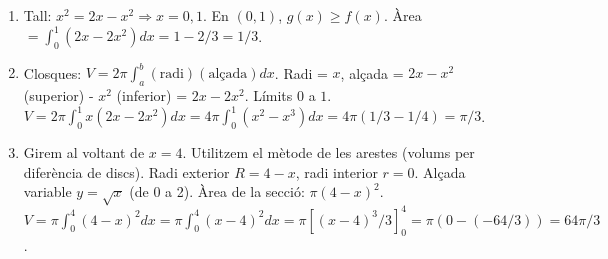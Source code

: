 \documentclass[12pt]{article}
\begin{document}
\begin{enumerate}[label=\arabic*.]
    \item Tall: $x^2 = 2x-x^2 \Rightarrow x=0,1$. En $(0,1)$, $g(x)\ge f(x)$. Àrea $= \int_0^1 (2x-2x^2)dx = 1-2/3 = 1/3$.

    \item Closques: $V = 2\pi \int_a^b (\text{radi})(\text{alçada}) dx$. Radi = $x$, alçada = $2x - x^2$ (superior) - $x^2$ (inferior) = $2x-2x^2$. Límits $0$ a $1$. $V=2\pi \int_0^1 x(2x-2x^2)dx = 4\pi \int_0^1 (x^2-x^3)dx = 4\pi(1/3-1/4)=\pi/3$.

    \item Girem al voltant de $x=4$. Utilitzem el mètode de les arestes (volums per diferència de discs). Radi exterior $R=4-x$, radi interior $r=0$. Alçada variable $y=\sqrt{x}$ (de 0 a 2). Àrea de la secció: $\pi(4-x)^2$. $V=\pi\int_0^4 (4-x)^2 dx = \pi\int_0^4 (x-4)^2 dx = \pi [ (x-4)^3/3 ]_0^4 = \pi(0 - (-64/3)) = 64\pi/3$.
\end{enumerate}
\end{document}
